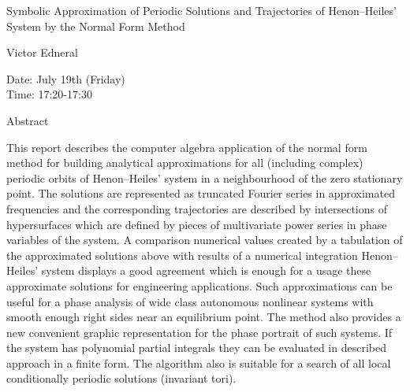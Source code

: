 \begin{center}
\LARGE
Symbolic Approximation of Periodic Solutions and
 Trajectories of Henon--Heiles' System by the Normal Form
                             Method
\end{center}

\begin{center}
\Large
Victor Edneral

\end{center}

\noindent
Date:  July 19th (Friday)\\
Time:  17:20-17:30\\

\begin{center}
\large
Abstract
\end{center}

This report describes the computer algebra application of the normal form method for building
analytical approximations for all (including complex) periodic orbits of Henon--Heiles' system in
a neighbourhood of the zero stationary point. The solutions are represented as truncated Fourier
series in approximated frequencies and the corresponding trajectories are described by
intersections of hypersurfaces which are defined by pieces of multivariate power series in phase
variables of the system. A comparison numerical values created by a tabulation of the
approximated solutions above with results of a numerical integration Henon--Heiles' system
displays a good agreement which is enough for a usage these approximate solutions for engineering
applications. Such approximations can be useful for a phase analysis of wide class autonomous
nonlinear systems with smooth enough right sides near an equilibrium point. The method also
provides a new convenient graphic representation for the phase portrait of such systems. If the
system has polynomial partial integrals they can be evaluated in described approach in a finite
form. The algorithm also is suitable for a search of all local conditionally periodic solutions
(invariant tori). 
